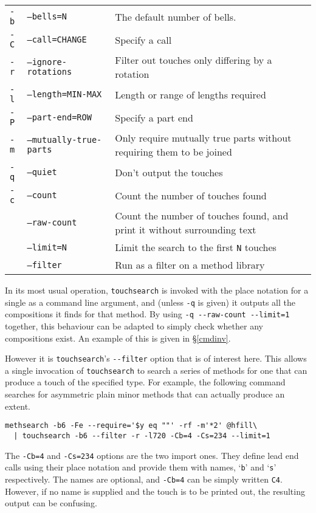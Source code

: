 \documentclass[a4paper,11pt,oneside]{book}
\newcommand{\sref}[1]{\hyperref[#1]{\S\ref{#1}}}
\begin{document}
\begin{tabularx}{\textwidth}{llX}
\texttt{-b}&\texttt{--bells=N}&The default number of bells.\\
\texttt{-C}&\texttt{--call=CHANGE}&Specify a call\\
\texttt{-r}&\texttt{--ignore-rotations}
  &Filter out touches only differing by a rotation\\
\texttt{-l}&\texttt{--length=MIN-MAX}
  &Length or range of lengths required\\
\texttt{-P}&\texttt{--part-end=ROW}&Specify a part end\\
\texttt{-m}&\texttt{--mutually-true-parts}
  &Only require mutually true parts without requiring them to be joined\\
\texttt{-q}&\texttt{--quiet}&Don't output the touches\\
\texttt{-c}&\texttt{--count}&Count the number of touches found\\
           &\texttt{--raw-count}&
  Count the number of touches found, and print it without surrounding text\\
           &\texttt{--limit=N}&
  Limit the search to the first \texttt{N} touches\\
           &\texttt{--filter}&Run as a filter on a method library\\
\end{tabularx}

In its most usual operation, \texttt{touchsearch} is invoked with the place
notation for a single as a command line argument, and 
(unless \verb+-q+ is given) it outputs all the compositions it finds for 
that method.   By using \verb+-q --raw-count --limit=1+ together, this
behaviour can be adapted to simply check whether any compositions exist.
An example of this is given in \sref{cmdinv}.

However it is \texttt{touchsearch}'s \verb+--filter+ option that is of 
interest here.  This allows a single invocation of \texttt{touchsearch} to
search a series of methods for one that can produce a touch of the specified
type.  For example, the following command searches for asymmetric plain minor
methods that can actually produce an extent.%
\begin{Verbatim}[commandchars=@~~]
methsearch -b6 -Fe --require='$y eq ""' -rf -m'*2' @hfill\
  | touchsearch -b6 --filter -r -l720 -Cb=4 -Cs=234 --limit=1
\end{Verbatim}

The \verb+-Cb=4+ and \verb+-Cs=234+ options are the two import ones.  
They define lead end calls using their place notation 
and provide them with names, `\verb+b+' and `\verb+s+' respectively.  
The names are optional, and \verb+-Cb=4+ can be simply written \verb+C4+.  
However, if no name is supplied and the touch is to be printed out, 
the resulting output can be confusing.
\end{document}
